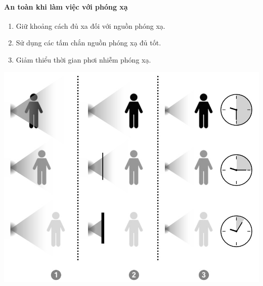 \paragraph{An toàn khi làm việc với phóng xạ}
\begin{enumerate}[label=\arabic*)]
	\item Giữ khoảng cách đủ xa đối với nguồn phóng xạ.
	\item Sử dụng các tấm chắn nguồn phóng xạ đủ tốt.
	\item Giảm thiểu thời gian phơi nhiễm phóng xạ.
\end{enumerate}
\begin{center}
	\includegraphics[scale=0.6]{figs/G10Y25B1-3}
\end{center}
